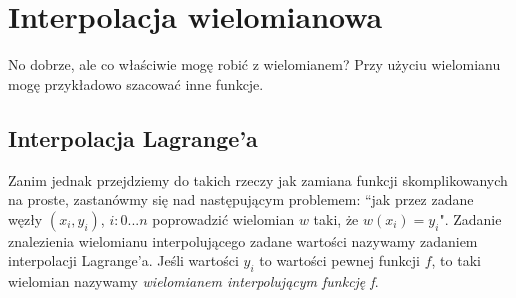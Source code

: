 \documentclass[hidelinks,a4paper,fleqn,oneside]{book}
\begin{document}
\section{Interpolacja wielomianowa}
No dobrze, ale co właściwie mogę robić z wielomianem? Przy użyciu wielomianu mogę przykładowo szacować inne funkcje.

\subsection{Interpolacja Lagrange'a}
Zanim jednak przejdziemy do takich rzeczy jak zamiana funkcji skomplikowanych na proste, zastanówmy się nad następującym problemem: ``jak przez zadane węzły $(x_i, y_i)$, $i: 0...n$ poprowadzić wielomian $w$ taki, że $w(x_i) = y_i$". Zadanie znalezienia wielomianu interpolującego zadane wartości nazywamy zadaniem interpolacji Lagrange'a. Jeśli wartości $y_i$ to wartości pewnej funkcji $f$, to taki wielomian nazywamy \textit{wielomianem interpolującym funkcję f}.
\begin{center}
\end{center}
\end{document}
